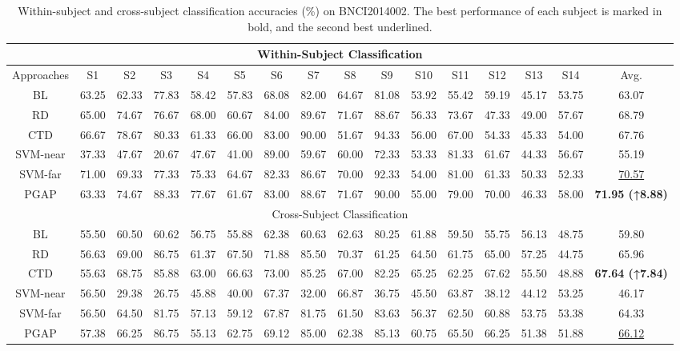 \documentclass[journal,twocolumn]{IEEEtran}
\begin{document}
\begin{table}[htpb] \centering
  \caption{Within-subject and cross-subject classification accuracies (\%) on BNCI2014002. The best performance of each subject is marked in bold, and the second best underlined.}
  \label{tab:2014002-result}
  \begin{tabular}{c|c|c|c|c|c|c|c|c|c|c|c|c|c|c|c}
  \toprule
  \multicolumn{16}{c}{Within-Subject Classification} \\
  \midrule
  Approaches & S1 & S2 & S3 & S4 & S5 & S6 & S7 & S8 & S9 & S10 & S11 & S12 & S13 & S14 & Avg. \\
  \midrule
  BL & 63.25 & 62.33 & 77.83 & 58.42 & 57.83 & 68.08 & 82.00 & 64.67 & 81.08 & 53.92 & 55.42 & 59.19 & 45.17 & 53.75 & 63.07 \\
  RD & 65.00 & 74.67 & 76.67 & 68.00 & 60.67 & 84.00 & 89.67 & 71.67 & 88.67 & 56.33 & 73.67 & 47.33 & 49.00 & 57.67 & 68.79 \\
  CTD & 66.67 & 78.67 & 80.33 & 61.33 & 66.00 & 83.00 & 90.00 & 51.67 & 94.33 & 56.00 & 67.00 & 54.33 & 45.33 & 54.00 & 67.76 \\
  SVM-near & 37.33 & 47.67 & 20.67 & 47.67 & 41.00 & 89.00 & 59.67 & 60.00 & 72.33 & 53.33 & 81.33 & 61.67 & 44.33 & 56.67 & 55.19 \\
  SVM-far & 71.00 & 69.33 & 77.33 & 75.33 & 64.67 & 82.33 & 86.67 & 70.00 & 92.33 & 54.00 & 81.00 & 61.33 & 50.33 & 52.33 & \underline{70.57} \\
  PGAP & 63.33 & 74.67 & 88.33 & 77.67 & 61.67 & 83.00 & 88.67 & 71.67 & 90.00 & 55.00 & 79.00 & 70.00 & 46.33 & 58.00 & \textbf{71.95 (↑8.88)} \\
  \midrule
  \multicolumn{16}{c}{Cross-Subject Classification} \\
  \midrule
  BL & 55.50 & 60.50 & 60.62 & 56.75 & 55.88 & 62.38 & 60.63 & 62.63 & 80.25 & 61.88 & 59.50 & 55.75 & 56.13 & 48.75 & 59.80 \\
  RD & 56.63 & 69.00 & 86.75 & 61.37 & 67.50 & 71.88 & 85.50 & 70.37 & 61.25 & 64.50 & 61.75 & 65.00 & 57.25 & 44.75 & 65.96 \\
  CTD & 55.63 & 68.75 & 85.88 & 63.00 & 66.63 & 73.00 & 85.25 & 67.00 & 82.25 & 65.25 & 62.25 & 67.62 & 55.50 & 48.88 & \textbf{67.64 (↑7.84)} \\
  SVM-near & 56.50 & 29.38 & 26.75 & 45.88 & 40.00 & 67.37 & 32.00 & 66.87 & 36.75 & 45.50 & 63.87 & 38.12 & 44.12 & 53.25 & 46.17 \\
  SVM-far & 56.50 & 64.50 & 81.75 & 57.13 & 59.12 & 67.87 & 81.75 & 61.50 & 83.63 & 56.37 & 62.50 & 60.88 & 53.75 & 53.38 & 64.33 \\
  PGAP & 57.38 & 66.25 & 86.75 & 55.13 & 62.75 & 69.12 & 85.00 & 62.38 & 85.13 & 60.75 & 65.50 & 66.25 & 51.38 & 51.88 & \underline{66.12} \\
  \bottomrule
  \end{tabular}
\end{table}
\end{document}
